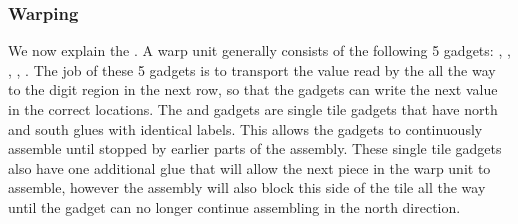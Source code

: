 \subsubsection{ Warping }

We now explain the {\warpunit}. A warp unit generally consists of the following 5 gadgets: \prewarp,
\firstwarp, \warpbridge, \secondwarp, \postwarp. The job of these 5 gadgets is to transport the value
read by the {\cread} all the way to the digit region in the next row, so that the {\cwrite} gadgets
can write the next value in the correct locations. The {\firstwarp} and {\secondwarp} gadgets are single
tile gadgets that have north and south glues with identical labels. This allows the gadgets to continuously
assemble until stopped by earlier parts of the assembly. These single tile gadgets also have one additional glue
that will allow the next piece in the warp unit to assemble, however the assembly will also block this side of the tile
all the way until the gadget can no longer continue assembling in the north direction.

